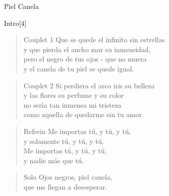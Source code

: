\begin{song}[son]{Piel Canela}

\begin{instrumental}{Intro}[4]
      
\end{instrumental}

\begin{verse}{Couplet 1}
  Que se quede el infinito sin estrellas\hspace{3em}\\
  y que pierda el ancho mar su inmensidad,\\
  pero el negro de tus ojos - que no muera\\
  y el canela de tu piel se quede igual.
\end{verse}

\begin{verse}{Couplet 2}
  Si perdiera el arco iris su belleza\hspace{3em}\\
  y las flores su perfume y su color \\
  no ser\'{\i}a tan inmensa mi tristeza \\
  como aquella de quedarme sin tu amor.
\end{verse}

\begin{verse}{Refrein}
  Me importas t\'{u}, y t\'{u}, y t\'{u},  \\
  y solamente t\'{u}, y t\'{u}, y t\'{u}.  \\
  Me importas t\'{u}, y t\'{u}, y t\'{u},  \\
  y nadie m\'{a}s que t\'{u}.
\end{verse}

\begin{verse}{Solo}
  Ojos negros, piel canela,  \\
  que me llegan a desesperar.  \\
\end{verse}

\end{song}

